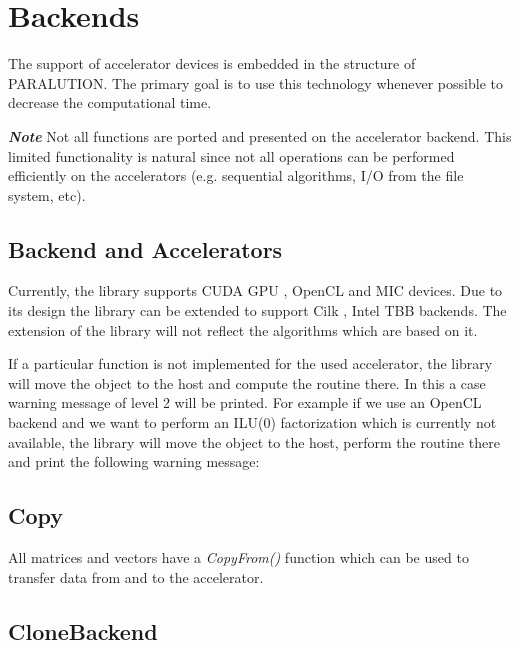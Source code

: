 \chapter{Backends}

The support of accelerator devices is embedded in the structure of PARALUTION. The primary goal is to use this technology whenever possible to decrease the computational time. 

\textbf{\emph{Note}} Not all functions are ported and presented on the accelerator backend. This limited functionality is natural since not all operations can be performed efficiently on the accelerators (e.g. sequential algorithms, I/O from the file system, etc).


\section{Backend and Accelerators}

Currently, the library supports CUDA GPU \cite{cuda}, OpenCL \cite{opencl} and MIC \cite{mic} devices. Due to its design the library can be extended to support Cilk \cite{cilk}, Intel TBB \cite{tbb} backends. The extension of the library will not reflect the algorithms which are based on it.

If a particular function is not implemented for the used accelerator, the library will move the object to the host and compute the routine there. In this a case warning message of level 2 will be printed. For example if we use an OpenCL backend and we want to perform an ILU($0$) factorization which is currently not available, the library will move the object to the host, perform the routine there and print the following warning message:




\section{Copy}

All matrices and vectors have a \emph{CopyFrom()} function which can be used to transfer data from and to the accelerator.



\section{CloneBackend}

